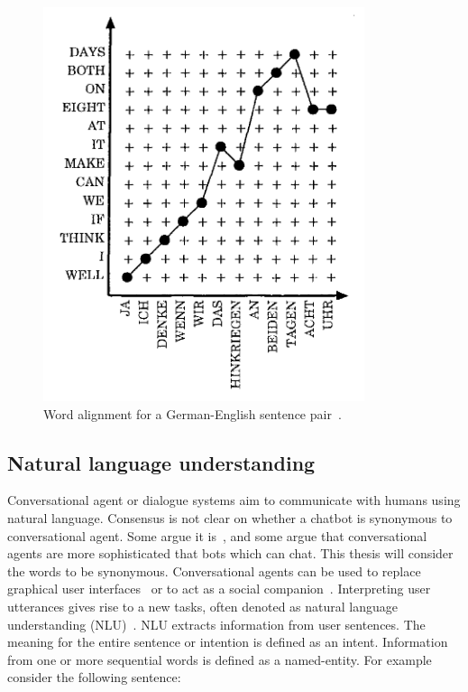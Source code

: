 \begin{figure}[htbp]
    \begin{center}
        \includegraphics[scale=0.4]{figures/alignment.png}
        \vspace*{-2mm}
    \end{center}
    \caption{Word alignment for a German-English sentence pair~\cite[Figure 1]{vogel1996hmm}.}
    \label{fig:alignment}
\end{figure}

\subsection{Natural language understanding}
\label{subsec:nlu}
Conversational agent or dialogue systems aim to communicate with humans using natural language.
Consensus is not clear on whether a chatbot is synonymous to conversational agent.
Some argue it is~\citep{io2017chatbots}, and some argue that conversational agents are more sophisticated that bots which can chat.
This thesis will consider the words to be synonymous.
Conversational agents can be used to replace graphical user interfaces~\citep{brennan1990conversation} or to act as a social companion~\citep{fitzpatrick2017delivering, zhou2018design}.
Interpreting user utterances gives rise to a new tasks, often denoted as natural language understanding (NLU)~\citep{jaech2016domain, braun2017, yang2017end}.
NLU extracts information from user sentences.
The meaning for the entire sentence or intention is defined as an intent.
Information from one or more sequential words is defined as a named-entity.
For example consider the following sentence:

